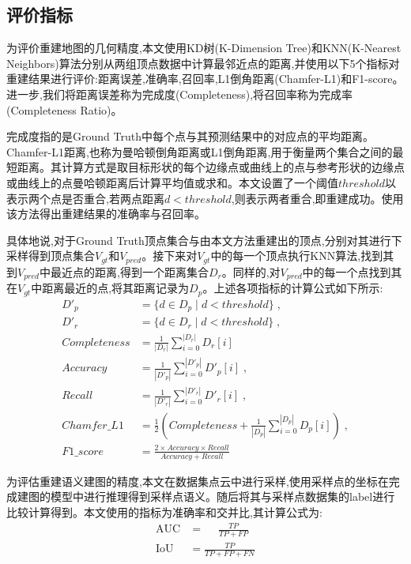 \subsection{评价指标}\label{metric}
为评价重建地图的几何精度,本文使用KD树\cite{kd}(K-Dimension Tree)和KNN\cite{knn}(K-Nearest Neighbors)算法分别从两组顶点数据中计算最邻近点的距离,并使用以下5个指标对重建结果进行评价:距离误差,准确率,召回率,L1倒角距离(Chamfer-L1)和F1-score。进一步,我们将距离误差称为完成度(Completeness),将召回率称为完成率(Completeness Ratio)。

完成度指的是Ground Truth中每个点与其预测结果中的对应点的平均距离。Chamfer-L1距离,也称为曼哈顿倒角距离或L1倒角距离,用于衡量两个集合之间的最短距离。其计算方式是取目标形状的每个边缘点或曲线上的点与参考形状的边缘点或曲线上的点曼哈顿距离后计算平均值或求和。本文设置了一个阈值$threshold$以表示两个点是否重合,若两点距离$d<threshold$,则表示两者重合,即重建成功。使用该方法得出重建结果的准确率与召回率。

具体地说,对于Ground Truth顶点集合与由本文方法重建出的顶点,分别对其进行下采样得到顶点集合$V_{gt}$和$V_{pred}$。接下来对$V_{gt}$中的每一个顶点执行KNN算法,找到其到$V_{pred}$中最近点的距离,得到一个距离集合$D_{r}$。同样的,对$V_{pred}$中的每一个点找到其在$V_{gt}$中距离最近的点,将其距离记录为$D_{p}$。上述各项指标的计算公式如下所示:
\begin{equation*}
\begin{alignedat}{2}
D'_{p} &= \{d \in D_{p} \mid d < threshold\}\;,\\
D'_{r} &= \{d \in D_r\mid d<threshold\}\;,\\
Completeness &= \frac{1}{|D_{r}|}\sum_{i=0}^{|D_{r}|}D_{r}[i]\;\\
Accuracy&= \frac{1}{|D'_{p}|}\sum_{i=0}^{|D'_{p}|}D'_{p}[i]\;,\\
Recall &=\frac{1}{|D'_{r}|}\sum_{i=0}^{|D'_{r}|}D'_{r}[i]\;,\\
Chamfer\_L1 &= \frac{1}{2}\left(Completeness + \frac{1}{|D_{p}|}\sum_{i=0}^{|D_{p}|}D_{p}[i]\right)\;,\\
F1\_score &= \frac{2\times Accuracy\times Recall}{Accuracy + Recall}
\end{alignedat}
\end{equation*}

为评估重建语义建图的精度,本文在数据集点云中进行采样,使用采样点的坐标在完成建图的模型中进行推理得到采样点语义。随后将其与采样点数据集的label进行比较计算得到。本文使用的指标为准确率和交并比,其计算公式为:
\begin{equation*}
    \begin{alignedat}{2}
    \mbox{AUC} &=\quad\;\frac{TP}{TP+FP}\\
    \mbox{IoU} &=\frac{TP}{TP + FP + FN}
    \end{alignedat}
\end{equation*}
